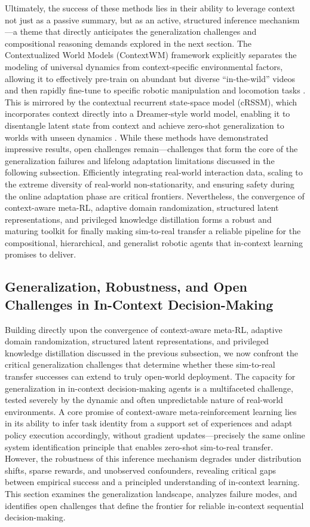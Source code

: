 \documentclass[11pt]{article}
\begin{document}
Ultimately, the success of these methods lies in their ability to leverage context not just as a passive summary, but as an active, structured inference mechanism---a theme that directly anticipates the generalization challenges and compositional reasoning demands explored in the next section. The Contextualized World Models (ContextWM) framework explicitly separates the modeling of universal dynamics from context-specific environmental factors, allowing it to effectively pre-train on abundant but diverse ``in-the-wild'' videos and then rapidly fine-tune to specific robotic manipulation and locomotion tasks \cite{ref408}. This is mirrored by the contextual recurrent state-space model (cRSSM), which incorporates context directly into a Dreamer-style world model, enabling it to disentangle latent state from context and achieve zero-shot generalization to worlds with unseen dynamics \cite{ref409}. While these methods have demonstrated impressive results, open challenges remain---challenges that form the core of the generalization failures and lifelong adaptation limitations discussed in the following subsection. Efficiently integrating real-world interaction data, scaling to the extreme diversity of real-world non-stationarity, and ensuring safety during the online adaptation phase are critical frontiers. Nevertheless, the convergence of context-aware meta-RL, adaptive domain randomization, structured latent representations, and privileged knowledge distillation forms a robust and maturing toolkit for finally making sim-to-real transfer a reliable pipeline for the compositional, hierarchical, and generalist robotic agents that in-context learning promises to deliver.

\subsection{Generalization, Robustness, and Open Challenges in In-Context Decision-Making}

Building directly upon the convergence of context-aware meta-RL, adaptive domain randomization, structured latent representations, and privileged knowledge distillation discussed in the previous subsection, we now confront the critical generalization challenges that determine whether these sim-to-real transfer successes can extend to truly open-world deployment. The capacity for generalization in in-context decision-making agents is a multifaceted challenge, tested severely by the dynamic and often unpredictable nature of real-world environments. A core promise of context-aware meta-reinforcement learning lies in its ability to infer task identity from a support set of experiences and adapt policy execution accordingly, without gradient updates---precisely the same online system identification principle that enables zero-shot sim-to-real transfer. However, the robustness of this inference mechanism degrades under distribution shifts, sparse rewards, and unobserved confounders, revealing critical gaps between empirical success and a principled understanding of in-context learning. This section examines the generalization landscape, analyzes failure modes, and identifies open challenges that define the frontier for reliable in-context sequential decision-making.
\end{document}
